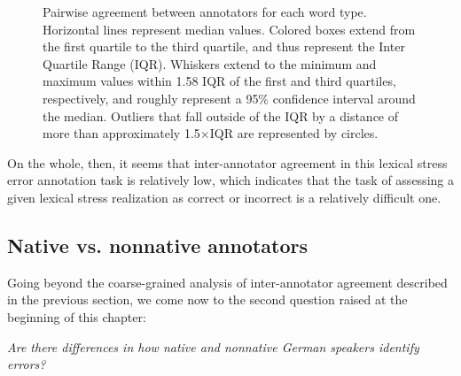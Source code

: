 \begin{figure}[phtb]
			\caption[Pairwise agreement statistics by word type]{Pairwise agreement between annotators for each word type. 	
			Horizontal lines represent median values. Colored boxes extend from the first quartile to the third quartile, and thus represent the Inter Quartile Range (IQR). Whiskers extend to the minimum and maximum values within 1.58 IQR of the first and third quartiles, respectively, and roughly represent a 95\% confidence interval around the median. 
			 Outliers that fall outside of the IQR by a distance of more than approximately 1.5$\times$IQR  are represented by circles.
			}
			\label{fig:agreement:words}
		\end{figure}
		
		
	
		
		 On the whole, then, it seems that inter-annotator agreement in this lexical stress error annotation task is relatively low, which indicates that the task of assessing a given lexical stress realization as correct or incorrect is a relatively difficult one. 
	
	
		\subsection{Native vs. nonnative annotators}
		\label{sec:agreement:native}

		
		
		Going beyond the coarse-grained analysis of inter-annotator agreement described in the previous section, we come now to the second question raised at the beginning of this chapter:
		
		\textit{Are there differences in how native and nonnative German speakers identify errors?}
		
		
